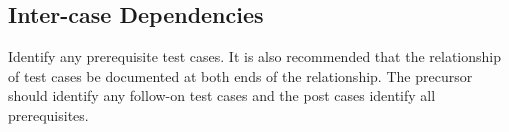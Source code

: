 \documentclass{./template/openetcs_report}
\begin{document}
\subsection{Inter-case Dependencies}
 Identify any prerequisite test cases.
It is also recommended that the relationship of test cases be documented at both ends of
the relationship. The precursor should identify any follow-on test cases and the
post cases identify all prerequisites.



% 
% 
% 
% 
% 
% 
% 
% 
\end{document}
